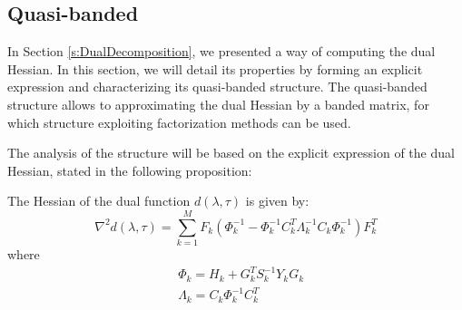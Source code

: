 \subsection{Quasi-banded} \label{s:QuasiBanded}
In Section \ref{s:DualDecomposition}, we presented a way of computing the dual Hessian. In this section, we will detail its properties by forming an explicit expression and characterizing its quasi-banded structure. The quasi-banded structure allows to approximating the dual Hessian by a banded matrix, for which structure exploiting factorization methods can be used.

The analysis of the structure will be based on the explicit expression of the dual Hessian, stated in the following proposition:
\begin{proposition}
The Hessian of the dual function $d(\lambda, \tau)$ is given by:
\begin{equation}
\label{e:dualhessian2}
\nabla^2 d(\lambda, \tau) = \sum_{k=1}^M F_k (\Phi_k^{-1} - \Phi_k^{-1} C_k^T \Lambda_k^{-1} C_k \Phi_k^{-1}) F_k^T
\end{equation}
where
\begin{align}
& \Phi_k = H_k + G_k^T S_k^{-1} Y_k G_k \label{e:Phi} \\
& \Lambda_k = C_k \Phi_k^{-1} C_k^{T} \label{e:Lambda}
\end{align}
\end{proposition}

